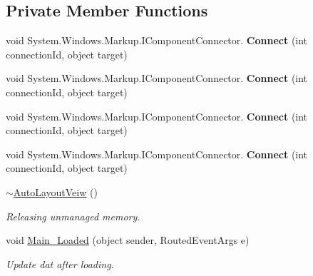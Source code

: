 \subsection*{Private Member Functions}
\begin{DoxyCompactItemize}
\item 
\mbox{\label{class_wpf_handler_1_1_u_i_1_1_auto_layout_1_1_controls_1_1_auto_layout_veiw_af70d3c35cfef9f3e0c611ef4f01fcf35}} 
void System.\+Windows.\+Markup.\+I\+Component\+Connector. {\bfseries Connect} (int connection\+Id, object target)
\item 
\mbox{\label{class_wpf_handler_1_1_u_i_1_1_auto_layout_1_1_controls_1_1_auto_layout_veiw_af70d3c35cfef9f3e0c611ef4f01fcf35}} 
void System.\+Windows.\+Markup.\+I\+Component\+Connector. {\bfseries Connect} (int connection\+Id, object target)
\item 
\mbox{\label{class_wpf_handler_1_1_u_i_1_1_auto_layout_1_1_controls_1_1_auto_layout_veiw_af70d3c35cfef9f3e0c611ef4f01fcf35}} 
void System.\+Windows.\+Markup.\+I\+Component\+Connector. {\bfseries Connect} (int connection\+Id, object target)
\item 
\mbox{\label{class_wpf_handler_1_1_u_i_1_1_auto_layout_1_1_controls_1_1_auto_layout_veiw_af70d3c35cfef9f3e0c611ef4f01fcf35}} 
void System.\+Windows.\+Markup.\+I\+Component\+Connector. {\bfseries Connect} (int connection\+Id, object target)
\item 
\mbox{\hyperlink{class_wpf_handler_1_1_u_i_1_1_auto_layout_1_1_controls_1_1_auto_layout_veiw_a1a6e98c4dc79f492b2174080f07c6705}{$\sim$\+Auto\+Layout\+Veiw}} ()
\begin{DoxyCompactList}\small\item\em Releasing unmanaged memory. \end{DoxyCompactList}\item 
void \mbox{\hyperlink{class_wpf_handler_1_1_u_i_1_1_auto_layout_1_1_controls_1_1_auto_layout_veiw_a651648035cd4ac0e459c8cf1daa81116}{Main\+\_\+\+Loaded}} (object sender, Routed\+Event\+Args e)
\begin{DoxyCompactList}\small\item\em Update dat after loading. \end{DoxyCompactList}\end{DoxyCompactItemize}
